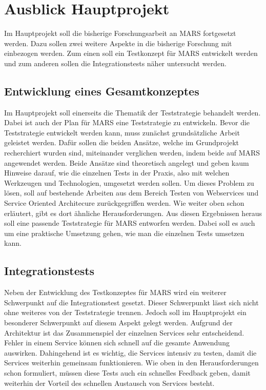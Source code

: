 \documentclass{llncs}
\begin{document}
\section{Ausblick Hauptprojekt}
Im Hauptprojekt soll die bisherige Forschungsarbeit an MARS fortgesetzt werden. Dazu sollen zwei weitere Aspekte in die bisherige Forschung mit einbezogen werden. Zum einen soll ein Testkonzept für MARS entwickelt werden und zum anderen sollen die Integrationstests näher untersucht werden.

\subsection{Entwicklung eines Gesamtkonzeptes}
Im Hauptprojekt soll einerseits die Thematik der Teststrategie behandelt werden. Dabei ist auch der Plan für MARS eine Teststrategie zu entwickeln. Bevor die Teststrategie entwickelt werden kann, muss zunächst grundsätzliche Arbeit geleistet werden. Dafür sollen die beiden Ansätze, welche im Grundprojekt recherchiert wurden sind, miteinander verglichen werden, indem beide auf MARS angewendet werden. Beide Ansätze sind theoretisch angelegt und geben kaum Hinweise darauf, wie die einzelnen Tests in der Praxis, also mit welchen Werkzeugen und Technologien, umgesetzt werden sollen. Um dieses Problem zu lösen, soll auf bestehende Arbeiten aus dem Bereich Testen von Webservices und Service Oriented Architecure zurückgegriffen werden. Wie weiter oben schon erläutert, gibt es dort ähnliche Herausforderungen. Aus diesen Ergebnissen heraus soll eine passende Teststrategie für MARS entworfen werden. Dabei soll es auch um eine praktische Umsetzung gehen, wie man die einzelnen Tests umsetzen kann. 

\subsection{Integrationstests}
Neben der Entwicklung des Testkonzeptes für MARS wird ein weiterer Schwerpunkt auf die Integrationstest gesetzt. Dieser Schwerpunkt lässt sich nicht ohne weiteres von der Teststrategie trennen. Jedoch soll im Hauptprojekt ein besonderer Schwerpunkt auf diesem Aspekt gelegt werden. Aufgrund der Architektur ist das Zusammenspiel der einzelnen Services sehr entscheidend. Fehler in einem Service können sich schnell auf die gesamte Anwendung auswirken. Dahingehend ist es wichtig, die Services intensiv zu testen, damit die Services weiterhin gemeinsam funktionieren. Wie oben in den Herausforderungen schon formuliert, müssen diese Tests auch ein schnelles Feedback geben, damit weiterhin der Vorteil des schnellen Austausch von Services besteht. 
\end{document}
